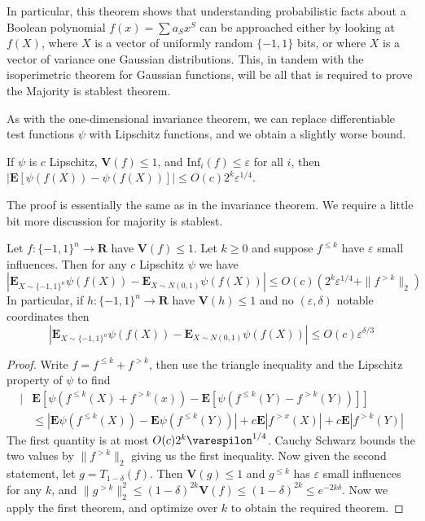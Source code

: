 In particular, this theorem shows that understanding probabilistic facts about a Boolean polynomial $f(x) = \sum a_S x^S$ can be approached either by looking at $f(X)$, where $X$ is a vector of uniformly random $\{ -1, 1 \}$ bits, or where $X$ is a vector of variance one Gaussian distributions. This, in tandem with the isoperimetric theorem for Gaussian functions, will be all that is required to prove the Majority is stablest theorem.

As with the one-dimensional invariance theorem, we can replace differentiable test functions $\psi$ with Lipschitz functions, and we obtain a slightly worse bound.

\begin{theorem}
    If $\psi$ is $c$ Lipschitz, $\mathbf{V}(f) \leq 1$, and $\text{Inf}_i(f) \leq \varepsilon$ for all $i$, then $|\mathbf{E}[\psi(f(X)) - \psi(f(X))]| \leq O(c) 2^k \varepsilon^{1/4}$.
\end{theorem}

The proof is essentially the same as in the invariance theorem. We require a little bit more discussion  for majority is stablest.

\begin{theorem}
    Let $f: \{ -1, 1 \}^n \to \mathbf{R}$ have $\mathbf{V}(f) \leq 1$. Let $k \geq 0$ and suppose $f^{\leq k}$ have $\varepsilon$ small influences. Then for any $c$ Lipschitz $\psi$ we have
    \[ \left| \mathbf{E}_{X \sim \{ -1, 1 \}^n} \psi(f(X)) - \mathbf{E}_{X \sim N(0,1)} \psi(f(X)) \right| \leq O(c)(2^k \varepsilon^{1/4} + \| f^{> k} \|_2) \]
    In particular, if $h: \{ -1, 1 \}^n \to \mathbf{R}$ have $\mathbf{V}(h) \leq 1$ and no $(\varepsilon, \delta)$ notable coordinates then
    \[ \left| \mathbf{E}_{X \sim \{ -1, 1 \}^n} \psi(f(X)) - \mathbf{E}_{X \sim N(0,1)} \psi(f(X)) \right| \leq O(c) \varepsilon^{\delta/3} \]
\end{theorem}
\begin{proof}
    Write $f = f^{\leq k} + f^{> k}$, then use the triangle inequality and the Lipschitz property of $\psi$ to find
    \begin{align*}
        |&\mathbf{E}[\psi(f^{\leq k}(X) + f^{> k}(x)) - \mathbf{E}[\psi(f^{\leq k}(Y) - f^{> k}(Y))]]\\
        &\leq |\mathbf{E} \psi(f^{\leq k}(X)) - \mathbf{E} \psi(f^{\leq k}(Y))| + c \mathbf{E}|f^{> x}(X)| + c \mathbf{E}|f^{> k}(Y)|
    \end{align*}
    The first quantity is at most $O(c)2^k \varespilon^{1/4}$. Cauchy Schwarz bounds the two values by $\| f^{> k} \|_2$ giving us the first inequality. Now given the second statement, let $g = T_{1-\delta}(f)$. Then $\mathbf{V}(g) \leq 1$ and $g^{\leq k}$ has $\varepsilon$ small influences for any $k$, and $\| g^{> k} \|_2^2 \leq (1 - \delta)^{2k} \mathbf{V}(f) \leq (1 - \delta)^{2k} \leq e^{-2k\delta}$. Now we apply the first theorem, and optimize over $k$ to obtain the required theorem.
\end{proof}


